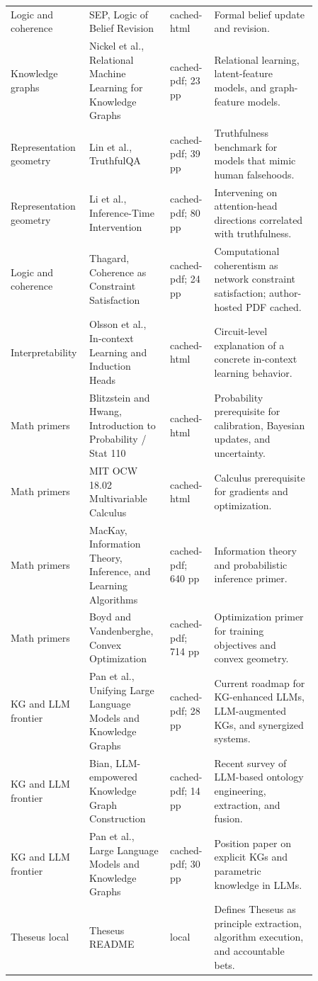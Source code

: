 \documentclass[11pt]{article}
\begin{document}
\begin{longtable}{p{0.16\linewidth}p{0.25\linewidth}p{0.13\linewidth}p{0.32\linewidth}}
Logic and coherence & SEP, Logic of Belief Revision & cached-html & Formal belief update and revision. \\
Knowledge graphs & Nickel et al., Relational Machine Learning for Knowledge Graphs & cached-pdf; 23 pp & Relational learning, latent-feature models, and graph-feature models. \\
Representation geometry & Lin et al., TruthfulQA & cached-pdf; 39 pp & Truthfulness benchmark for models that mimic human falsehoods. \\
Representation geometry & Li et al., Inference-Time Intervention & cached-pdf; 80 pp & Intervening on attention-head directions correlated with truthfulness. \\
Logic and coherence & Thagard, Coherence as Constraint Satisfaction & cached-pdf; 24 pp & Computational coherentism as network constraint satisfaction; author-hosted PDF cached. \\
Interpretability & Olsson et al., In-context Learning and Induction Heads & cached-html & Circuit-level explanation of a concrete in-context learning behavior. \\
Math primers & Blitzstein and Hwang, Introduction to Probability / Stat 110 & cached-html & Probability prerequisite for calibration, Bayesian updates, and uncertainty. \\
Math primers & MIT OCW 18.02 Multivariable Calculus & cached-html & Calculus prerequisite for gradients and optimization. \\
Math primers & MacKay, Information Theory, Inference, and Learning Algorithms & cached-pdf; 640 pp & Information theory and probabilistic inference primer. \\
Math primers & Boyd and Vandenberghe, Convex Optimization & cached-pdf; 714 pp & Optimization primer for training objectives and convex geometry. \\
KG and LLM frontier & Pan et al., Unifying Large Language Models and Knowledge Graphs & cached-pdf; 28 pp & Current roadmap for KG-enhanced LLMs, LLM-augmented KGs, and synergized systems. \\
KG and LLM frontier & Bian, LLM-empowered Knowledge Graph Construction & cached-pdf; 14 pp & Recent survey of LLM-based ontology engineering, extraction, and fusion. \\
KG and LLM frontier & Pan et al., Large Language Models and Knowledge Graphs & cached-pdf; 30 pp & Position paper on explicit KGs and parametric knowledge in LLMs. \\
Theseus local & Theseus README & local & Defines Theseus as principle extraction, algorithm execution, and accountable bets. \\

\end{longtable}
\end{document}
